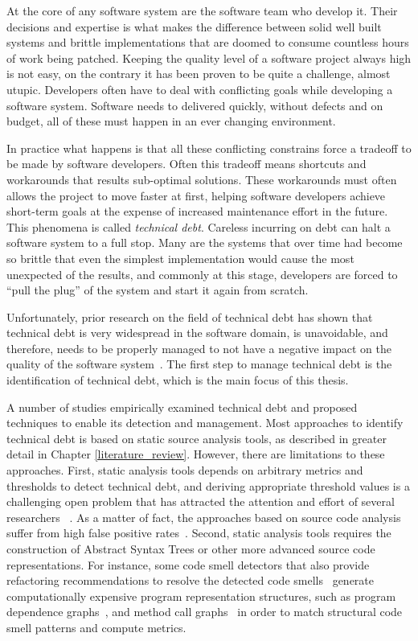 
At the core of any software system are the software team who develop it. Their decisions and expertise is what makes the difference between solid well built systems and brittle implementations that are doomed to consume countless hours of work being patched. Keeping the quality level of a software project always high is not easy, on the contrary it has been proven to be quite a challenge, almost utupic. Developers often have to deal with conflicting goals while developing a software system. Software needs to delivered quickly, without defects and on budget, all of these must happen in an ever changing environment.

In practice what happens is that all these conflicting constrains force a tradeoff to be made by software developers. Often this tradeoff means shortcuts and workarounds that results sub-optimal solutions. These workarounds must often allows the project to move faster at first, helping software developers achieve short-term goals at the expense of increased maintenance effort in the future. This phenomena is called \emph{technical debt}. Careless incurring on debt can halt a software system to a full stop. Many are the systems that over time had become so brittle that even the simplest implementation would cause the most unexpected of the results, and commonly at this stage, developers are forced to ``pull the plug'' of the system and start it again from scratch. 

Unfortunately, prior research on the field of technical debt has shown that technical debt is very widespread in the software domain, is unavoidable, and therefore, needs to be properly managed to not have a negative impact on the quality of the software system~\cite{Lim2012Software}. The first step to manage technical debt is the identification of technical debt, which is the main focus of this thesis. 

A number of studies empirically examined technical debt and proposed techniques to enable its detection and management. Most approaches to identify technical debt is based on static source analysis tools, as described in greater detail in Chapter \ref{literature_review}. However, there are limitations to these approaches. First, static analysis tools depends on arbitrary metrics and thresholds to detect technical debt, and deriving appropriate threshold values is a challenging open problem that has attracted the attention and effort of several researchers ~\cite{Oliveira2014CSMR,Fontana2015WETSoM,Fontana2015EMSE}. As a matter of fact, the approaches based on source code analysis suffer from high false positive rates~\cite{Fontana2016SANER}. Second, static analysis tools requires the construction of Abstract Syntax Trees or other more advanced source code representations. For instance, some code smell detectors that also provide refactoring recommendations to resolve the detected code smells~\cite{Tsantalis2011TSE,Tsantalis2015TSE} generate computationally expensive program representation structures, such as program dependence graphs~\cite{Graf2010SCAM}, and method call graphs~\cite{Ali2012ECOOP} in order to match structural code smell patterns and compute metrics.

